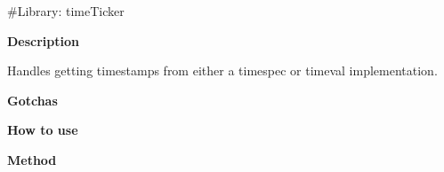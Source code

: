 \#\+Library\+: time\+Ticker

{\bfseries{Description}}

Handles getting timestamps from either a timespec or timeval implementation.

{\bfseries{Gotchas}}

{\bfseries{How to use}}

{\bfseries{Method}} 